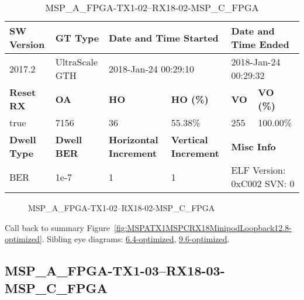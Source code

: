 \begin{table}[h]
\centering
\caption{MSP\_A\_FPGA-TX1-02--RX18-02-MSP\_C\_FPGA}
\label{tab:MSPAFPGATX102RX1802MSPCFPGA12.8-optimized}
\begin{tabular}{@{}|l|l|l|l|l|l|@{}}
\toprule
\textbf{SW Version}                & \textbf{GT Type}   & \multicolumn{2}{l|}{\textbf{Date and Time Started}}            & \multicolumn{2}{l|}{\textbf{Date and Time Ended}}        \\ \midrule
2017.2                       & UltraScale GTH          & \multicolumn{2}{l|}{2018-Jan-24 00:29:10}                   & \multicolumn{2}{l|}{2018-Jan-24 00:29:32}               \\ \midrule
\textbf{Reset RX}                  & \textbf{OA} & \textbf{HO}   & \textbf{HO (\%)} & \textbf{VO} & \textbf{VO (\%)} \\ \midrule
true & 7156        & 36          & 55.38\%        & 255        & 100.00\%       \\ \midrule
\textbf{Dwell Type}                & \textbf{Dwell BER} & \textbf{Horizontal Increment} & \textbf{Vertical Increment}    & \multicolumn{2}{l|}{\textbf{Misc Info}}                  \\ \midrule
BER                            & 1e-7        & 1        & 1           & \multicolumn{2}{l|}{ELF Version: 0xC002 SVN: 0}                         \\ \bottomrule
\end{tabular}
\end{table}

\begin{figure}[h]
\caption{MSP\_A\_FPGA-TX1-02--RX18-02-MSP\_C\_FPGA} \label{fig:MSPAFPGATX102RX1802MSPCFPGA12.8-optimized}
\end{figure}

Call back to summary Figure~\ref{fig:MSPATX1MSPCRX18MinipodLoopback12.8-optimized}.
Sibling eye diagrams: \hyperref[sec:MSPAFPGATX102RX1802MSPCFPGA6.4-optimized]{6.4-optimized}, \hyperref[sec:MSPAFPGATX102RX1802MSPCFPGA9.6-optimized]{9.6-optimized}.

\clearpage
\newpage


\subsection{MSP\_A\_FPGA-TX1-03--RX18-03-MSP\_C\_FPGA}\label{sec:MSPAFPGATX103RX1803MSPCFPGA12.8-optimized}

